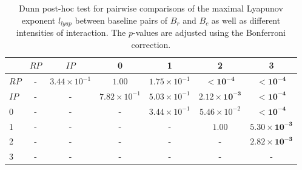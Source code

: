 \begin{table}
\centering
\caption{Dunn post-hoc test for pairwise comparisons of the maximal Lyapunov exponent $l_{lyap}$ between baseline pairs of $B_r$ and $B_c$ as well as different intensities of interaction. The $p$-values are adjusted using the Bonferroni correction.}
\label{tab:dunn_lyapunov}
\begin{tabular}{lcccccc}
\toprule
 & $RP$ & $IP$ & 0 & 1 & 2 & 3 \\
\midrule
$RP$ & - & $3.44 \times 10^{-1}$ & $1.00$ & $1.75 \times 10^{-1}$ & $\mathbf{< 10^{-4}}$ & $\mathbf{< 10^{-4}}$ \\
$IP$ & - & - & $7.82 \times 10^{-1}$ & $5.03 \times 10^{-1}$ & $\mathbf{2.12 \times 10^{-3}}$ & $\mathbf{< 10^{-4}}$ \\
0 & - & - & - & $3.44 \times 10^{-1}$ & $5.46 \times 10^{-2}$ & $\mathbf{< 10^{-4}}$ \\
1 & - & - & - & - & $1.00$ & $\mathbf{5.30 \times 10^{-3}}$ \\
2 & - & - & - & - & - & $\mathbf{2.82 \times 10^{-3}}$ \\
3 & - & - & - & - & - & - \\
\bottomrule
\end{tabular}
\end{table}
